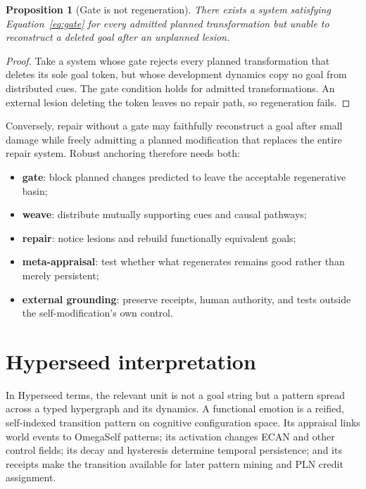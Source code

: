 \documentclass[11pt]{article}
\newtheorem{proposition}{Proposition}
\begin{document}
\begin{proposition}[Gate is not regeneration]
There exists a system satisfying Equation~\ref{eq:gate} for every admitted
planned transformation but unable to reconstruct a deleted goal after an
unplanned lesion.
\end{proposition}

\begin{proof}
Take a system whose gate rejects every planned transformation that deletes its
sole goal token, but whose development dynamics copy no goal from distributed
cues.  The gate condition holds for admitted transformations.  An external
lesion deleting the token leaves no repair path, so regeneration fails.
\end{proof}

Conversely, repair without a gate may faithfully reconstruct a goal after small
damage while freely admitting a planned modification that replaces the entire
repair system.  Robust anchoring therefore needs both:
\begin{itemize}[leftmargin=*]
  \item \textbf{gate}: block planned changes predicted to leave the acceptable
  regenerative basin;
  \item \textbf{weave}: distribute mutually supporting cues and causal pathways;
  \item \textbf{repair}: notice lesions and rebuild functionally equivalent goals;
  \item \textbf{meta-appraisal}: test whether what regenerates remains good rather
  than merely persistent;
  \item \textbf{external grounding}: preserve receipts, human authority, and
  tests outside the self-modification's own control.
\end{itemize}

\section{Hyperseed interpretation}

In Hyperseed terms, the relevant unit is not a goal string but a pattern spread
across a typed hypergraph and its dynamics.  A functional emotion is a reified,
self-indexed transition pattern on cognitive configuration space.  Its appraisal
links world events to OmegaSelf patterns; its activation changes ECAN and other
control fields; its decay and hysteresis determine temporal persistence; and its
receipts make the transition available for later pattern mining and PLN credit
assignment.
\end{document}
